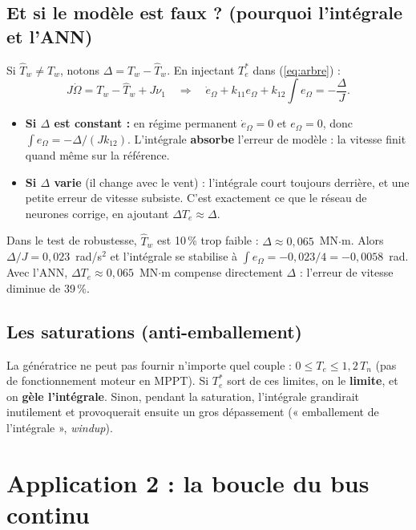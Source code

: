 \documentclass[11pt,a4paper]{article}
\begin{document}
\subsection{Et si le modèle est faux ? (pourquoi l'intégrale et l'ANN)}
Si $\hat T_w \neq T_w$, notons $\Delta = T_w - \hat T_w$. En injectant $T_e^*$ dans (\ref{eq:arbre}) :
\begin{equation}
J\dot\Omega = T_w - \hat T_w + J\nu_1 \quad\Longrightarrow\quad
\dot e_\Omega + k_{11}e_\Omega + k_{12}\!\int\! e_\Omega = -\frac{\Delta}{J}.
\end{equation}
\begin{itemize}
\item \textbf{Si $\Delta$ est constant :} en régime permanent $\dot e_\Omega = 0$ et $e_\Omega = 0$, donc
$\int e_\Omega = -\Delta/(J k_{12})$. L'intégrale \textbf{absorbe} l'erreur de modèle : la vitesse finit
quand même sur la référence.
\item \textbf{Si $\Delta$ varie} (il change avec le vent) : l'intégrale court toujours derrière, et une petite
erreur de vitesse subsiste. C'est exactement ce que le réseau de neurones corrige, en ajoutant
$\Delta T_e \approx \Delta$.
\end{itemize}
\begin{exemple}
Dans le test de robustesse, $\hat T_w$ est 10\,\% trop faible : $\Delta \approx 0{,}065$~MN$\cdot$m.
Alors $\Delta/J = 0{,}023$~rad/s$^2$ et l'intégrale se stabilise à $\int e_\Omega = -0{,}023/4 = -0{,}0058$~rad.
Avec l'ANN, $\Delta T_e \approx 0{,}065$~MN$\cdot$m compense directement $\Delta$ : l'erreur de vitesse
diminue de 39\,\%.
\end{exemple}

\subsection{Les saturations (anti-emballement)}
La génératrice ne peut pas fournir n'importe quel couple : $0 \le T_e \le 1{,}2\,T_n$ (pas de fonctionnement
moteur en MPPT). Si $T_e^*$ sort de ces limites, on le \textbf{limite}, et on \textbf{gèle l'intégrale}.
Sinon, pendant la saturation, l'intégrale grandirait inutilement et provoquerait ensuite un gros
dépassement (« emballement de l'intégrale », \emph{windup}).

\section{Application 2 : la boucle du bus continu}
\end{document}
